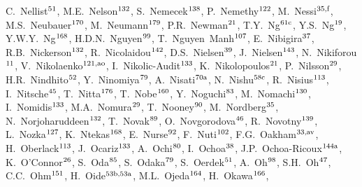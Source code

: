 \begin{flushleft}
C.~Nellist$^\textrm{\scriptsize 51}$,    
M.E.~Nelson$^\textrm{\scriptsize 132}$,    
S.~Nemecek$^\textrm{\scriptsize 138}$,    
P.~Nemethy$^\textrm{\scriptsize 122}$,    
M.~Nessi$^\textrm{\scriptsize 35,f}$,    
M.S.~Neubauer$^\textrm{\scriptsize 170}$,    
M.~Neumann$^\textrm{\scriptsize 179}$,    
P.R.~Newman$^\textrm{\scriptsize 21}$,    
T.Y.~Ng$^\textrm{\scriptsize 61c}$,    
Y.S.~Ng$^\textrm{\scriptsize 19}$,    
Y.W.Y.~Ng$^\textrm{\scriptsize 168}$,    
H.D.N.~Nguyen$^\textrm{\scriptsize 99}$,    
T.~Nguyen~Manh$^\textrm{\scriptsize 107}$,    
E.~Nibigira$^\textrm{\scriptsize 37}$,    
R.B.~Nickerson$^\textrm{\scriptsize 132}$,    
R.~Nicolaidou$^\textrm{\scriptsize 142}$,    
D.S.~Nielsen$^\textrm{\scriptsize 39}$,    
J.~Nielsen$^\textrm{\scriptsize 143}$,    
N.~Nikiforou$^\textrm{\scriptsize 11}$,    
V.~Nikolaenko$^\textrm{\scriptsize 121,ao}$,    
I.~Nikolic-Audit$^\textrm{\scriptsize 133}$,    
K.~Nikolopoulos$^\textrm{\scriptsize 21}$,    
P.~Nilsson$^\textrm{\scriptsize 29}$,    
H.R.~Nindhito$^\textrm{\scriptsize 52}$,    
Y.~Ninomiya$^\textrm{\scriptsize 79}$,    
A.~Nisati$^\textrm{\scriptsize 70a}$,    
N.~Nishu$^\textrm{\scriptsize 58c}$,    
R.~Nisius$^\textrm{\scriptsize 113}$,    
I.~Nitsche$^\textrm{\scriptsize 45}$,    
T.~Nitta$^\textrm{\scriptsize 176}$,    
T.~Nobe$^\textrm{\scriptsize 160}$,    
Y.~Noguchi$^\textrm{\scriptsize 83}$,    
M.~Nomachi$^\textrm{\scriptsize 130}$,    
I.~Nomidis$^\textrm{\scriptsize 133}$,    
M.A.~Nomura$^\textrm{\scriptsize 29}$,    
T.~Nooney$^\textrm{\scriptsize 90}$,    
M.~Nordberg$^\textrm{\scriptsize 35}$,    
N.~Norjoharuddeen$^\textrm{\scriptsize 132}$,    
T.~Novak$^\textrm{\scriptsize 89}$,    
O.~Novgorodova$^\textrm{\scriptsize 46}$,    
R.~Novotny$^\textrm{\scriptsize 139}$,    
L.~Nozka$^\textrm{\scriptsize 127}$,    
K.~Ntekas$^\textrm{\scriptsize 168}$,    
E.~Nurse$^\textrm{\scriptsize 92}$,    
F.~Nuti$^\textrm{\scriptsize 102}$,    
F.G.~Oakham$^\textrm{\scriptsize 33,av}$,    
H.~Oberlack$^\textrm{\scriptsize 113}$,    
J.~Ocariz$^\textrm{\scriptsize 133}$,    
A.~Ochi$^\textrm{\scriptsize 80}$,    
I.~Ochoa$^\textrm{\scriptsize 38}$,    
J.P.~Ochoa-Ricoux$^\textrm{\scriptsize 144a}$,    
K.~O'Connor$^\textrm{\scriptsize 26}$,    
S.~Oda$^\textrm{\scriptsize 85}$,    
S.~Odaka$^\textrm{\scriptsize 79}$,    
S.~Oerdek$^\textrm{\scriptsize 51}$,    
A.~Oh$^\textrm{\scriptsize 98}$,    
S.H.~Oh$^\textrm{\scriptsize 47}$,    
C.C.~Ohm$^\textrm{\scriptsize 151}$,    
H.~Oide$^\textrm{\scriptsize 53b,53a}$,    
M.L.~Ojeda$^\textrm{\scriptsize 164}$,    
H.~Okawa$^\textrm{\scriptsize 166}$,    

\end{flushleft}
